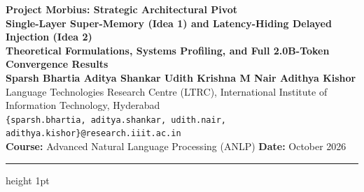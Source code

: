 \documentclass[11pt,a4paper]{article}
\begin{document}
\begin{center}
    {\LARGE \textbf{\color{primaryblue} Project Morbius: Strategic Architectural Pivot}}\\[0.35em]
    {\Large \textbf{Single-Layer Super-Memory (Idea 1) and Latency-Hiding Delayed Injection (Idea 2)}}\\[0.3em]
    {\large \textbf{Theoretical Formulations, Systems Profiling, and Full 2.0B-Token Convergence Results}}\\[1.1em]

    {\textbf{Sparsh Bhartia \quad Aditya Shankar \quad Udith Krishna M Nair \quad Adithya Kishor}}\\[0.35em]
    {\normalsize Language Technologies Research Centre (LTRC), International Institute of Information Technology, Hyderabad}\\[0.2em]
    {\normalsize \texttt{\{sparsh.bhartia, aditya.shankar, udith.nair, adithya.kishor\}@research.iiit.ac.in}}\\[0.7em]
    {\small \textbf{Course:} Advanced Natural Language Processing (ANLP) \quad \textbar \quad \textbf{Date:} October 2026}
\end{center}

\vspace{0.4em}
\hrule height 1pt
\vspace{0.8em}
\end{document}
